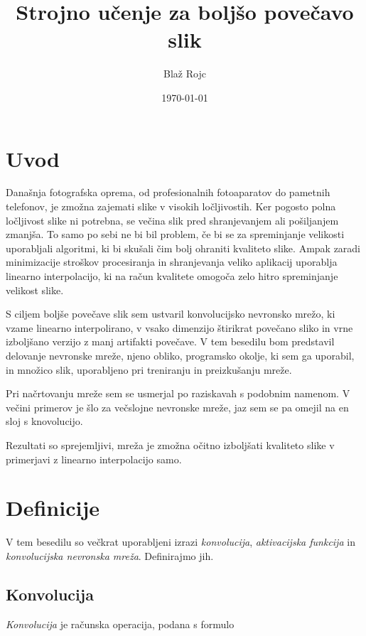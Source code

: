 \documentclass[a4paper,11pt]{article}
\title{\textbf{Strojno učenje za boljšo povečavo slik}}
\author{Blaž Rojc}
\date{\today}
\begin{document}
\maketitle

\section{Uvod}

Današnja fotografska oprema, od profesionalnih fotoaparatov do pametnih telefonov, je zmožna zajemati slike v visokih ločljivostih.
Ker pogosto polna ločljivost slike ni potrebna, se večina slik pred shranjevanjem ali pošiljanjem zmanjša.
To samo po sebi ne bi bil problem, če bi se za spreminjanje velikosti uporabljali algoritmi, ki bi skušali čim bolj ohraniti kvaliteto slike.
Ampak zaradi minimizacije stroškov procesiranja in shranjevanja veliko aplikacij uporablja linearno interpolacijo, ki na račun kvalitete omogoča zelo
	hitro spreminjanje velikost slike.

S ciljem boljše povečave slik sem ustvaril konvolucijsko nevronsko mrežo, ki vzame linearno interpolirano, v vsako dimenzijo štirikrat povečano sliko
	in vrne izboljšano verzijo z manj artifakti povečave.
V tem besedilu bom predstavil delovanje nevronske mreže, njeno obliko, programsko okolje, ki sem ga uporabil, in množico slik, uporabljeno
	pri treniranju in preizkušanju mreže.

Pri načrtovanju mreže sem se usmerjal po raziskavah s podobnim namenom.\cite{intel1, intel2, intel3}
V večini primerov je šlo za večslojne nevronske mreže, jaz sem se pa omejil na en sloj s knovolucijo.

Rezultati so sprejemljivi, mreža je zmožna očitno izboljšati kvaliteto slike v primerjavi z linearno interpolacijo samo.

\section{Definicije}

V tem besedilu so večkrat uporabljeni izrazi \emph{konvolucija}, \emph{aktivacijska funkcija} in \emph{konvolucijska nevronska mreža}.
Definirajmo jih.

\subsection{Konvolucija}

\emph{Konvolucija} \cite{torch_conv2d} je računska operacija, podana s formulo
\end{document}
